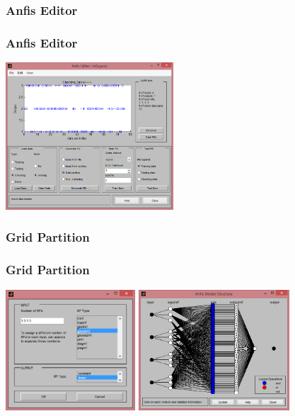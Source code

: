 \documentclass[xetex,serif,mathserif,14pt]{beamer}
\begin{document}
\subsubsection{Anfis Editor}
\begin{frame}
\frametitle{Anfis Editor}
\centering
\includegraphics[height=5.5cm]{images/ANFIS.png}
\end{frame}

\subsubsection{Grid Partition}
\begin{frame}
\frametitle{Grid Partition}
\centering
\includegraphics[height=4.5cm]{images/gridParam.png}
\includegraphics[height=4.5cm]{images/anfisModelGrid.png}

\end{frame}
\end{document}
